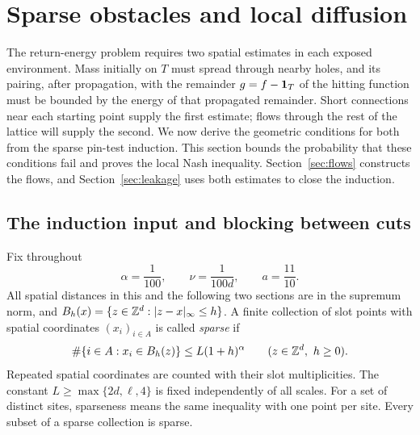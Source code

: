 \section{Sparse obstacles and local diffusion}\label{sec:sparse}

The return-energy problem requires two spatial estimates in each exposed
environment.  Mass initially on $T$ must spread through nearby holes,
and its pairing, after propagation, with the remainder $g=f-\mathbf 1_T$ of
the hitting function must be bounded by the energy of that propagated
remainder.
Short connections near each starting point supply the first estimate;
flows through the rest of the lattice will supply the second.
We now derive the geometric conditions for both from the sparse pin-test
induction.  This section bounds the probability that these conditions
fail and proves the local Nash inequality.
Section~\ref{sec:flows} constructs the flows, and
Section~\ref{sec:leakage} uses both estimates to close the induction.

\subsection{The induction input and blocking between cuts}

Fix throughout
\begin{equation}\label{eq:sparse-exponents}
 \alpha=\frac1{100},\qquad \nu=\frac1{100d},\qquad a=\frac{11}{10}.
\end{equation}
All spatial distances in this and the following two sections are in the
supremum norm, and
\(B_h(x)=\{z\in\mathbb Z^d:|z-x|_\infty\le h\}\).
A finite collection of slot points with spatial coordinates \((x_i)_{i\in A}\)
is called \emph{sparse} if
\begin{equation}\label{eq:sparse-growth}
 \#\{i\in A:x_i\in B_h(z)\}\le L(1+h)^\alpha
 \qquad(z\in\mathbb Z^d,\ h\ge0).
\end{equation}
Repeated spatial coordinates are counted with their slot multiplicities.
The constant \(L\ge\max\{2d,\ell,4\}\) is fixed independently of all scales.
For a set of distinct sites, sparseness means the same inequality with one
point per site.  Every subset of a sparse collection is sparse.

